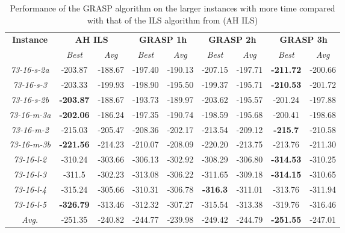 \documentclass[a4paper,11pt,authoryear]{elsarticle}
\begin{document}
{\scriptsize
\begin{longtable}{c|cc|cc|cc|cc}
\caption{Performance of the GRASP algorithm on the larger instances with more time compared with that of the ILS algorithm from \cite{aithaddadene2016} (AH ILS)}
\label{table:longerexperiments}\\
\hline
\textbf{Instance}  & \multicolumn{2}{c|}{\textbf{AH ILS}} & \multicolumn{2}{c|}{\textbf{GRASP 1h}} & \multicolumn{2}{c|}{\textbf{GRASP 2h}} & \multicolumn{2}{c}{\textbf{GRASP 3h}}\\
    & \emph{Best} & \emph{Avg} & \emph{Best} & \emph{Avg} & \emph{Best} & \emph{Avg} & \emph{Best} & \emph{Avg}\\
\hline                                              
    \hline																		
        \emph{73-16-s-2a}   	&	-203.87	&	-188.67	&	-197.40	&	-190.13	&	-207.15	&	-197.71	&	\textbf{-211.72}	&	-200.66	    \\	
        \emph{73-16-s-3}    	&	-203.33	&	-199.93	&	-198.90	&	-195.50	&	-199.37	&	-195.71	&	\textbf{-210.53}	&	-201.72	    \\	
        \emph{73-16-s-2b}   	&	\textbf{-203.87}	&	-188.67	&	-193.73	&	-189.97	&	-203.62	&	-195.57	&	-201.24	&	-197.88	    \\	
        \emph{73-16-m-3a}   	&	\textbf{-202.06}	&	-186.24	&	-197.35	&	-190.74	&	-198.59	&	-195.68	&	-200.41	&	-198.68	    \\	
        \emph{73-16-m-2}    	&	-215.03	&	-205.47	&	-208.36	&	-202.17	&	-213.54	&	-209.12	&	\textbf{-215.7}	&	-210.58	    \\	
        \emph{73-16-m-3b}   	&	\textbf{-221.56}	&	-214.23	&	-210.07	&	-208.09	&	-220.20	&	-213.75	&	-213.76	&	-211.30	    \\	
        \emph{73-16-l-2}    	&	-310.24	&	-303.66	&	-306.13	&	-302.92	&	-308.29	&	-306.80	&	\textbf{-314.53}	&	-310.25	    \\	
        \emph{73-16-l-3}    	&	-311.5	&	-302.23	&	-313.08	&	-306.22	&	-311.65	&	-309.18	&	\textbf{-314.15}	&	-310.65	    \\	
        \emph{73-16-l-4}    	&	-315.24	&	-305.66	&	-310.31	&	-306.78	&	\textbf{-316.3}	&	-311.01	&	-313.76	&	-311.94	    \\	
        \emph{73-16-l-5}    	&	\textbf{-326.79}	&	-313.46	&	-312.32	&	-307.27	&	-315.54	&	-313.38	&	-319.76	&	-316.46	    \\	\hline
\emph{Avg.}	&	-251.35	&	-240.82	&	-244.77	&	-239.98	&	-249.42	&	-244.79	&	\textbf{-251.55}	&	-247.01	    \\	

\hline
\end{longtable}
}
\end{document}
